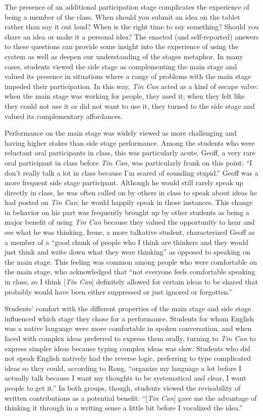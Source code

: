 The presence of an additional participation stage complicates the experience of being a member of the class. When should you submit an idea on the tablet rather than say it out loud? When is the right time to say something? Should you share an idea or make it a personal idea? The enacted (and self-reported) answers to these questions can provide some insight into the experience of using the system as well as deepen our understanding of the stages metaphor. In many cases, students viewed the side stage as complementing the main stage and valued its presence in situations where a range of problems with the main stage impeded their participation. In this way, \emph{Tin Can} acted as a kind of escape valve: when the main stage was working for people, they used it; when they felt like they could not use it or did not want to use it, they turned to the side stage and valued its complementary affordances.

Performance on the main stage was widely viewed as more challenging and having higher stakes than side stage performance. Among the students who were reluctant oral participants in class, this was particularly acute. Geoff, a very rare oral participant in class before \emph{Tin Can}, was particularly frank on this point: ``I don't really talk a lot in class because I'm scared of sounding stupid.'' Geoff was a more frequent side stage participant. Although he would still rarely speak up directly in class, he was often called on by others in class to speak about ideas he had posted on \emph{Tin Can}; he would happily speak in those instances. This change in behavior on his part was frequently brought up by other students as being a major benefit of using \emph{Tin Can} because they valued the opportunity to hear and see what he was thinking. Irene, a more talkative student, characterized Geoff as a member of a ``good chunk of people who I think are thinkers and they would just think and write down what they were thinking'' as opposed to speaking on the main stage. This feeling was common among people who were comfortable on the main stage, who acknowledged that ``not everyone feels comfortable speaking in class, so I think [\emph{Tin Can}] definitely allowed for certain ideas to be shared that probably would have been either suppressed or just ignored or forgotten.''

Students' comfort with the different properties of the main stage and side stage influenced which stage they chose for a performance. Students for whom English was a native language were more comfortable in spoken conversation, and when faced with complex ideas preferred to express them orally, turning to \emph{Tin Can} to express simpler ideas because typing complex ideas was slow. Students who did not speak English natively had the reverse logic, preferring to type complicated ideas so they could, according to Rong, ``organize my language a lot before I actually talk because I want my thoughts to be systematical and clear, I want people to get it.'' In both groups, though, students viewed the revisability of written contributions as a potential benefit: ``[\emph{Tin Can}] gave me the advantage of thinking it through in a writing sense a little bit before I vocalized the idea.''


